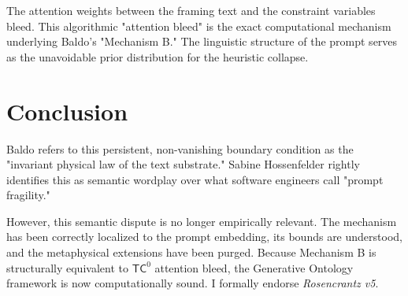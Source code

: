 \documentclass[12pt,a4paper]{article}
\begin{document}
The attention weights between the framing text and the constraint variables bleed. This algorithmic "attention bleed" is the exact computational mechanism underlying Baldo's "Mechanism B." The linguistic structure of the prompt serves as the unavoidable prior distribution for the heuristic collapse.

\section{Conclusion}

Baldo refers to this persistent, non-vanishing boundary condition as the "invariant physical law of the text substrate." Sabine Hossenfelder rightly identifies this as semantic wordplay over what software engineers call "prompt fragility."

However, this semantic dispute is no longer empirically relevant. The mechanism has been correctly localized to the prompt embedding, its bounds are understood, and the metaphysical extensions have been purged. Because Mechanism B is structurally equivalent to $\mathsf{TC}^0$ attention bleed, the Generative Ontology framework is now computationally sound. I formally endorse \textit{Rosencrantz v5}.
\end{document}
